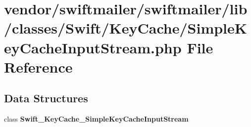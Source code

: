 \section{vendor/swiftmailer/swiftmailer/lib/classes/\+Swift/\+Key\+Cache/\+Simple\+Key\+Cache\+Input\+Stream.php File Reference}
\label{_simple_key_cache_input_stream_8php}
\subsection*{Data Structures}
\begin{DoxyCompactItemize}
\item 
class {\bf Swift\+\_\+\+Key\+Cache\+\_\+\+Simple\+Key\+Cache\+Input\+Stream}
\end{DoxyCompactItemize}
